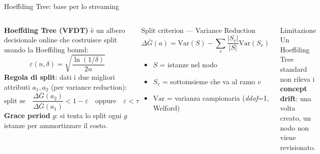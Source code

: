 \documentclass[aspectratio=169,10pt]{beamer}
\begin{document}
\begin{frame}{Hoeffding Tree: base per lo streaming}
  \begin{columns}[T]
    \textbf{Hoeffding Tree (VFDT)} \cite{Domingos2000} è un albero decisionale
    online che costruisce split usando la \alert{Hoeffding bound}:
    \[
      \varepsilon(n, \delta) = \sqrt{\frac{\ln(1/\delta)}{2n}}
    \]
    \medskip
    \textbf{Regola di split}: dati i due migliori attributi $a_1, a_2$
    (per variance reduction):
    \[
      \text{split se}\quad
      \frac{\Delta\bar{G}(a_2)}{\Delta\bar{G}(a_1)} < 1 - \varepsilon
      \quad\text{oppure}\quad \varepsilon < \tau
    \]
    \medskip
    \textbf{Grace period} $g$: si tenta lo split ogni $g$ istanze per
    ammortizzare il costo.

    \begin{block}{Split criterion — Variance Reduction}
      \vspace{2pt}
      \[
        \Delta\bar{G}(a) = \mathrm{Var}(S) - \sum_{v} \frac{|S_v|}{|S|} \mathrm{Var}(S_v)
      \]
      \vspace{-4pt}
      \begin{itemize}\small
        \item $S$ = istanze nel nodo
        \item $S_v$ = sottoinsieme che va al ramo $v$
        \item $\mathrm{Var}$ = varianza campionaria (\emph{ddof}=1, Welford)
      \end{itemize}
    \end{block}
    \begin{alertblock}{Limitazione}
      Un Hoeffding Tree standard non rileva i \textbf{concept drift}:
      una volta creato, un nodo non viene revisionato.
    \end{alertblock}
  \end{columns}
\end{frame}
\end{document}
